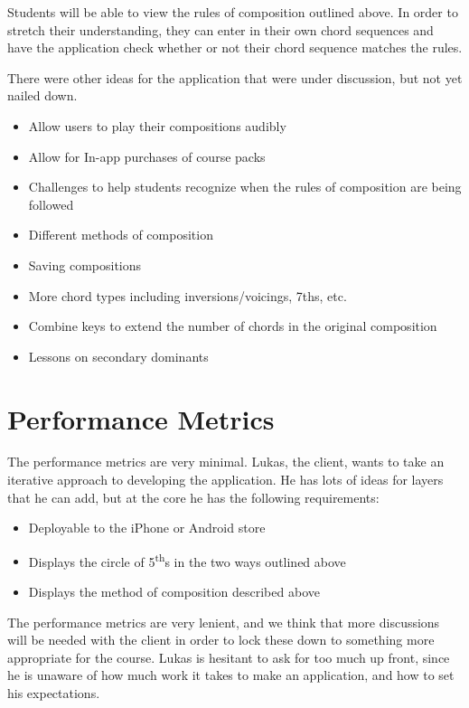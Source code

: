 \documentclass[onecolumn, draftclsnofoot,10pt, compsoc]{IEEEtran}
\begin{document}
    \par
    Students will be able to view the rules of composition outlined above.
    In order to stretch their understanding, they can enter in their own chord sequences and have the application check whether or not their chord sequence matches the rules.
    
    \par
    There were other ideas for the application that were under discussion, but not yet nailed down.
    \begin{itemize}
    \item Allow users to play their compositions audibly
    \item Allow for In-app purchases of course packs
    \item Challenges to help students recognize when the rules of composition are being followed
    \item Different methods of composition
    \item Saving compositions
    \item More chord types including inversions/voicings, 7ths, etc.
    \item Combine keys to extend the number of chords in the original composition
    \item Lessons on secondary dominants
    \end {itemize}
    \clearpage
    
    \section{Performance Metrics}
    
    The performance metrics are very minimal.
    Lukas, the client, wants to take an iterative approach to developing the application.
    He has lots of ideas for layers that he can add, but at the core he has the following requirements:
    \begin{itemize}
    \item Deployable to the iPhone or Android store
    \item Displays the circle of 5\textsuperscript{th}s in the two ways outlined above
    \item Displays the method of composition described above
    \end {itemize}
    
    \par
    The performance metrics are very lenient, and we think that more discussions will be needed with the client in order to lock these down to something more appropriate for the course.
    Lukas is hesitant to ask for too much up front, since he is unaware of how much work it takes to make an application, and how to set his expectations.
    
    
    
\end{document}
